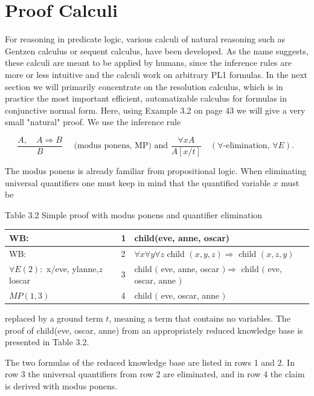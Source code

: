 \documentclass[10pt]{book}
\begin{document}
\section{Proof Calculi}
For reasoning in predicate logic, various calculi of natural reasoning such as Gentzen calculus or sequent calculus, have been developed. As the name suggests, these calculi are meant to be applied by humans, since the inference rules are more or less intuitive and the calculi work on arbitrary PL1 formulas. In the next section we will primarily concentrate on the resolution calculus, which is in practice the most important efficient, automatizable calculus for formulas in conjunctive normal form. Here, using Example 3.2 on page 43 we will give a very small "natural" proof. We use the inference rule

$$
\frac{A, \quad A \Rightarrow B}{B} \quad \text { (modus ponens, MP) and } \frac{\forall x A}{A[x / t]} \quad(\forall \text {-elimination, } \forall E) \text {. }
$$

The modus ponens is already familiar from propositional logic. When eliminating universal quantifiers one must keep in mind that the quantified variable $x$ must be

Table 3.2 Simple proof with modus ponens and quantifier elimination

\begin{center}
\begin{tabular}{lll}
\hline
WB: & 1 & child(eve, anne, oscar) \\
\hline
WB: & 2 & $\forall x \forall y \forall z$ child $(x, y, z) \Rightarrow$ child $(x, z, y)$ \\
\hline
$\forall E(2):$ x/eve, ylanne,$z$ loscar & 3 & child $($ eve, anne, oscar $) \Rightarrow$ child $($ eve, oscar, anne $)$ \\
\hline
$M P(1,3)$ & 4 & child $($ eve, oscar, anne $)$ \\
\hline
\end{tabular}
\end{center}

replaced by a ground term $t$, meaning a term that contains no variables. The proof of child(eve, oscar, anne) from an appropriately reduced knowledge base is presented in Table 3.2.


The two formulas of the reduced knowledge base are listed in rows 1 and 2. In row 3 the universal quantifiers from row 2 are eliminated, and in row 4 the claim is derived with modus ponens.
\end{document}

